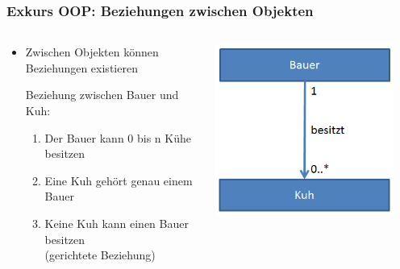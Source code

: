 \begin{frame}
\frametitle{Exkurs OOP: Beziehungen zwischen Objekten}
\begin{columns}
	    \begin{column}{.6\textwidth}
			\small
			\begin{itemize}
			  \item Zwischen Objekten k\"onnen Beziehungen existieren
			  \begin{item}
			  		Beziehung zwischen Bauer und Kuh:
					\begin{enumerate}
					  \item \tiny Der Bauer kann 0 bis n K\"uhe besitzen
					  \item \tiny Eine Kuh geh\"ort genau einem Bauer
					  \item \tiny Keine Kuh kann einen Bauer besitzen \\ (gerichtete Beziehung)
					\end{enumerate}
			  \end{item}
			\end{itemize}
			\normalsize
	    \end{column}
	    \begin{column}{.4\textwidth}
	   		\center
			\includegraphics[width=0.9\textwidth,
			keepaspectratio=true]{bilder/asso_kuh.png}
	    \end{column}
	\end{columns}
\end{frame}

